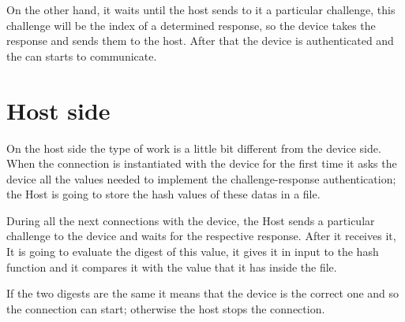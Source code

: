 On the other hand, it waits until the host sends to it a particular challenge, this challenge will be the index of a determined response, so the device takes the response and sends them to the host.
After that the device is authenticated and the can starts to communicate.



\section {Host side} 
On the host side the type of work is a little bit different from the device side.
When the connection is instantiated with the device for the first time it asks the device all the values needed to implement the challenge-response authentication; the Host is going to store the hash values of these datas in a file.

During all the next connections with the device, the Host sends a particular challenge to the device and waits for the respective response.
After it receives it, It is going to evaluate the digest of this value, it gives it in input to the hash function and it compares it with the value that it has inside the file.

If the two digests are the same it means that the device is the correct one and so the connection can start; otherwise the host stops the connection.



